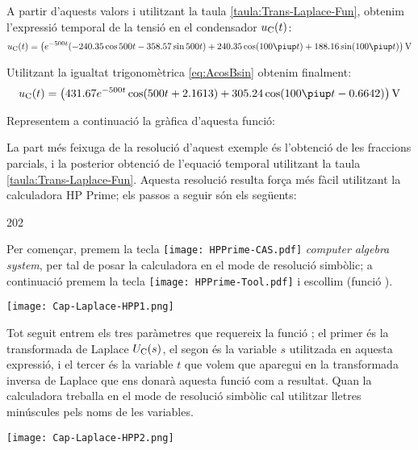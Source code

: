 \begin{exemple}
    A partir d'aquests valors i utilitzant la taula
    \vref{taula:Trans-Laplace-Fun}, obtenim l'expressió temporal de la
    tensió en el condensador $u_\mathrm{C}(t)$:
    \[
        u\ped{C}(t) = \left( e^{-500t} (\num{-240,35} \cos 500 t - \num{358,57} \sin 500
        t) + \num{240,35} \cos (100\piup t) + \num{188,16} \sin( 100\piup
        t) \right) \unit{V}
    \]

    Utilitzant la igualtat trigonomètrica \eqref{eq:AcosBsin} obtenim finalment:
    \[
        u\ped{C}(t)= \left(\num{431,67} e^{-500t} \cos(500 t +\num{2,1613}) + \num{305,24} \cos (100\piup t - \num{0,6642})\right) \unit{V}
    \]

    Representem a continuació la gràfica d'aquesta
    funció:

    \begin{center}
      
    \end{center}

    La part més feixuga de la resolució d'aquest exemple és l'obtenció de les fraccions parcials, i la posterior obtenció de l'equació temporal utilitzant la taula \ref{taula:Trans-Laplace-Fun}. Aquesta resolució resulta força més fàcil utilitzant la calculadora \textsf{HP Prime};
    els passos a seguir són els següents:

    \begin{dingautolist}{202}

        \item Per començar, premem la tecla \texttt{[image: HPPrime-CAS.pdf]} \textit{computer algebra system}, per tal de posar la calculadora en el mode de resolució simbòlic; a continuació premem la tecla \texttt{[image: HPPrime-Tool.pdf]} i escollim  (funció ).

            \texttt{[image: Cap-Laplace-HPP1.png]}

         \item Tot seguit entrem els tres paràmetres que requereix la funció ; el primer és la transformada de Laplace  $U_\mathrm{C}(s)$, el segon és la variable $s$ utilitzada en aquesta expressió, i el tercer és la variable $t$ que volem que aparegui en la transformada inversa de Laplace que ens donarà aquesta funció com a resultat. Quan la calculadora treballa en el  mode de resolució simbòlic cal utilitzar lletres minúscules pels noms de les variables.

            \texttt{[image: Cap-Laplace-HPP2.png]}\vspace{5mm}


\end{dingautolist}
\end{exemple}
